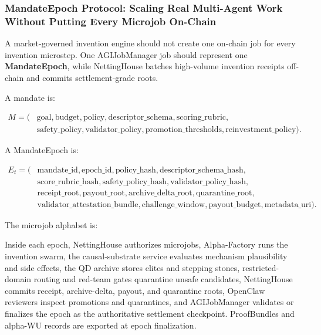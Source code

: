 \subsubsection{MandateEpoch Protocol: Scaling Real Multi-Agent Work
Without Putting Every Microjob
On-Chain}\label{mandateepoch-protocol-scaling-real-multi-agent-work-without-putting-every-microjob-on-chain}

A market-governed invention engine should not create one on-chain job
for every invention microstep. One AGIJobManager job should represent
one \textbf{MandateEpoch}, while NettingHouse batches high-volume
invention receipts off-chain and commits settlement-grade roots.

A mandate is:

\[
\begin{aligned}
M = (&\mathrm{goal}, \mathrm{budget}, \mathrm{policy},
\mathrm{descriptor\_schema}, \mathrm{scoring\_rubric},\\
&\mathrm{safety\_policy}, \mathrm{validator\_policy},
\mathrm{promotion\_thresholds}, \mathrm{reinvestment\_policy}).
\end{aligned}
\]

A MandateEpoch is:

\[
\begin{aligned}
E_t = (&\mathrm{mandate\_id}, \mathrm{epoch\_id}, \mathrm{policy\_hash},
\mathrm{descriptor\_schema\_hash},\\
&\mathrm{score\_rubric\_hash}, \mathrm{safety\_policy\_hash},
\mathrm{validator\_policy\_hash},\\
&\mathrm{receipt\_root}, \mathrm{payout\_root},
\mathrm{archive\_delta\_root}, \mathrm{quarantine\_root},\\
&\mathrm{validator\_attestation\_bundle}, \mathrm{challenge\_window},
\mathrm{payout\_budget}, \mathrm{metadata\_uri}).
\end{aligned}
\]

The microjob alphabet is:

\begin{Shaded}
\begin{Highlighting}[]
\end{Highlighting}
\end{Shaded}

Inside each epoch, NettingHouse authorizes microjobs, Alpha-Factory runs
the invention swarm, the causal-substrate service evaluates mechanism
plausibility and side effects, the QD archive stores elites and stepping
stones, restricted-domain routing and red-team gates quarantine unsafe
candidates, NettingHouse commits receipt, archive-delta, payout, and
quarantine roots, OpenClaw reviewers inspect promotions and quarantines,
and AGIJobManager validates or finalizes the epoch as the authoritative
settlement checkpoint. ProofBundles and alpha-WU records are exported at
epoch finalization.

